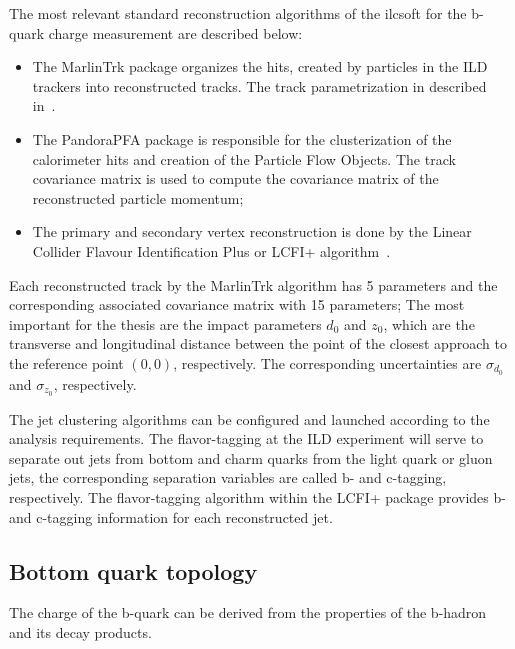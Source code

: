 
The most relevant standard reconstruction algorithms of the {\sc ilcsoft} for the b-quark charge measurement are described below:
\begin{itemize}
\item The MarlinTrk package organizes the hits, created by particles in the ILD trackers into reconstructed tracks. The track parametrization in described in~\cite{bib:LCIOtrack}. 
\item The PandoraPFA package is responsible for the clusterization of the calorimeter hits and creation of the Particle Flow Objects. The track covariance matrix is used to compute the covariance matrix of the reconstructed particle momentum; 
\item The primary and secondary vertex reconstruction is done by the Linear Collider Flavour Identification Plus or LCFI+ algorithm~\cite{bib:LCFI}. 
\end{itemize}
Each reconstructed track by the MarlinTrk algorithm has 5 parameters and the corresponding associated covariance matrix with 15 parameters; The most important for the thesis are the impact parameters $d_0$ and $z_0$, which are the transverse and longitudinal distance between the point of the closest approach to the reference point $(0,0)$, respectively. The corresponding uncertainties are $\sigma_{d_0}$ and $\sigma_{z_0}$, respectively.

The jet clustering algorithms can be configured and launched according to the analysis requirements. 
The flavor-tagging at the ILD experiment will serve to separate out jets from bottom and charm quarks from the light quark or gluon jets, the corresponding separation variables are called b- and c-tagging, respectively. 
The flavor-tagging algorithm within the LCFI+ package provides  b- and c-tagging information for each reconstructed jet.


\subsection{Bottom quark topology}

The charge of the b-quark can be derived from the properties of the b-hadron and its decay products. 


